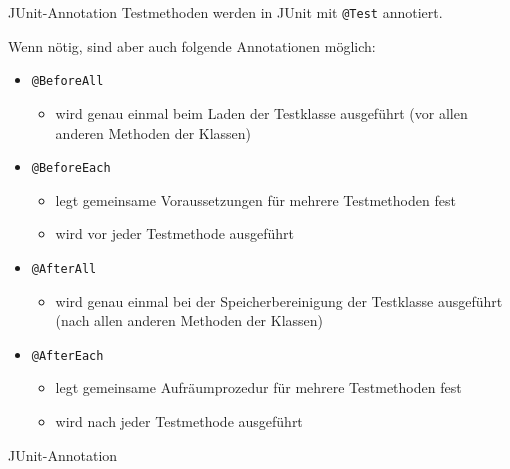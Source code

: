 \begin{defi}{JUnit-Annotation}
    Testmethoden werden in JUnit mit \texttt{@Test} annotiert.

    Wenn nötig, sind aber auch folgende Annotationen möglich:
    \begin{itemize}
        \item \texttt{@BeforeAll}
              \begin{itemize}
                  \item wird genau einmal beim Laden der Testklasse ausgeführt (vor allen anderen Methoden der Klassen)
              \end{itemize}
        \item \texttt{@BeforeEach}
              \begin{itemize}
                  \item legt gemeinsame Voraussetzungen für mehrere Testmethoden fest
                  \item wird vor jeder Testmethode ausgeführt
              \end{itemize}
        \item \texttt{@AfterAll}
              \begin{itemize}
                  \item wird genau einmal bei der Speicherbereinigung der Testklasse ausgeführt (nach allen anderen Methoden der Klassen)
              \end{itemize}
        \item \texttt{@AfterEach}
              \begin{itemize}
                  \item legt gemeinsame Aufräumprozedur für mehrere Testmethoden fest
                  \item wird nach jeder Testmethode ausgeführt
              \end{itemize}
    \end{itemize}
\end{defi}

\begin{example}{JUnit-Annotation}
    
\end{example}